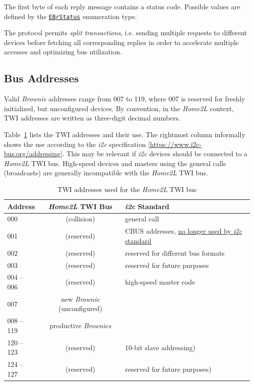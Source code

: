 \documentclass[12pt,english,parskip=half,headheight=19pt]{scrreprt}
\newcommand{\refapic}[1]{\href{home2l-api_c/index.html}{\mbox{\texttt{#1}}}}            %
\begin{document}
The first byte of each reply message contains a status code. Possible values are defined by the \refapic{EBrStatus} enumeration type.

The protocol permits \textit{split transactions}, i.e. sending multiple requests to different devices before fetching all corresponding replies in order to accelerate multiple accesses and optimizing bus utilization.



\subsection{Bus Addresses}
\label{sec:brownies-bus-addressing}

Valid \textit{Brownie} addresses range from 007 to 119, where 007 is reserved for freshly initialized, but unconfigured devices. By convention, in the \textit{Home2L} context, TWI addresses are written as three-digit decimal numbers.

Table~\ref{tab:brownies-addresses} lists the TWI addresses and their use. The rightmost column informally shows the use according to the \textit{i2c} specification [\url{https://www.i2c-bus.org/addressing}]. This may be relevant if \textit{i2c} devices should be connected to a \textit{Home2L} TWI bus. High-speed devices and masters using the general calls (broadcasts) are generally incompatible with the \textit{Home2L} TWI bus.

\begin{table}[ht]
  \centering
  \renewcommand{\arraystretch}{1.4}
  \begin{tabular}{l|c|l}
    Address & \textit{Home2L} TWI Bus & \textit{i2c} Standard \\
    \hline \hline
    000        & (collision)   & general call \\
    001        & (reserved)    & CBUS addresses, \href{https://www.i2c-bus.org/addressing/cbus-addresses}{no longer used by \textit{i2c} standard} \\
    002        & (reserved)    & reserved for different bus formats \\
    003        & (reserved)    & reserved for future purposes \\
    004 -- 006 & (reserved)    & high-speed master code \\
    007        & new \textit{Brownie} (unconfigured) & \\
    008 -- 119 & productive \textit{Brownies} \\
    120 -- 123 & (reserved)    & 10-bit slave addressing) \\
    124 -- 127 & (reserved)    & reserved for future purposes) \\
  \end{tabular}
  \caption[l]{TWI addresses used for the \textit{Home2L} TWI bus}
  \label{tab:brownies-addresses}
\end{table}
\end{document}
